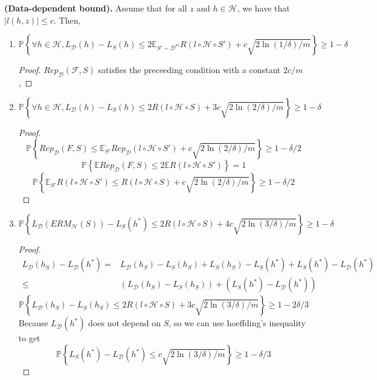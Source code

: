\begin{theorem}
    \textbf{(Data-dependent bound).}
    Assume that for all $ z $ and $ h \in \mathcal{H} $, we have that $ |l(h,z)| \le c $. Then,
    \begin{enumerate}
        \item 
            \[
                \mathbb{P} \left\{ \forall h \in \mathcal{H}, L_ \mathcal{D}(h) - L_S (h) \le 2 \mathbb{E}_{S'\sim \mathcal{D}^m} R( l\circ \mathcal{H}\circ S') + c \sqrt{2 \ln(1/\delta)/m} \right\} \ge 1-\delta
            \]
            \begin{proof}
                $ Rep_ \mathcal{D}( \mathcal{F}, S) $ satisfies the preceeding condition with a constant $ 2c/m $,
            \end{proof}
        \item  
            \[
                \mathbb{P} \left\{ \forall h \in \mathcal{H}, L_ \mathcal{D}(h) - L_S (h) \le 2 R( l\circ \mathcal{H}\circ S) + 3c \sqrt{2 \ln(2/\delta)/m} \right\} \ge 1-\delta
            \]
            \begin{proof}
                \[
                    \mathbb{P} \left\{ Rep_ \mathcal{D}(F, S) \le \mathbb{E}_{S'} Rep_ \mathcal{D}( l\circ \mathcal{H}\circ S') + c \sqrt{2 \ln(2/\delta)/m} \right\} \ge 1-\delta/2
                \]
                \[
                    \mathbb{P} \left\{ \mathbb{E}Rep_ \mathcal{D}(F, S) \le 2 \mathbb{E}R(l\circ \mathcal{H}\circ S') \right\} = 1
                \]
                \[
                    \mathbb{P} \left\{ \mathbb{E}_{S'} R( l\circ \mathcal{H}\circ S') \le R( l\circ \mathcal{H} \circ S) + c \sqrt{2 \ln(2/\delta)/m} \right\} \ge 1-\delta/2
                \]
            \end{proof}
        \item 
            \[
                \mathbb{P} \left\{ L_ \mathcal{D}(ERM_ \mathcal{H}(S)) - L_S (h^*) \le 2 R( l\circ \mathcal{H}\circ S) + 4c \sqrt{2 \ln(3/\delta)/m} \right\} \ge 1-\delta
            \]
            \begin{proof}
                \begin{align*}
                    L_ \mathcal{D}(h_S) - L_ \mathcal{D}(h^*)
                    =& L_ \mathcal{D}(h_S) - L_S(h_S) + L_S(h_S) - L_S(h^*) + L_S(h^*) - L_ \mathcal{D}(h^*)\\
                    \le& (L_ \mathcal{D}(h_S) - L_S(h_S)) + (L_S(h^*) - L_ \mathcal{D}(h^*))
                \end{align*}
            \[
                \mathbb{P} \left\{ L_ \mathcal{D}(h_S) - L_S (h_S) \le 2 R( l\circ \mathcal{H}\circ S) + 3c \sqrt{2 \ln(3/\delta)/m} \right\} \ge 1-2\delta/3
            \]
            Because $ L_ \mathcal{D}(h^*) $ does not depend on $ S $, so we can use hoeffding's inequality to get 
            \[
                \mathbb{P} \left\{ L_S(h^*) - L_ \mathcal{D}(h^*) \le c \sqrt{ {2\ln(3/\delta)}/{m} } \right\} \ge 1-\delta/3
            \]
            \end{proof}
    \end{enumerate}
\end{theorem}

